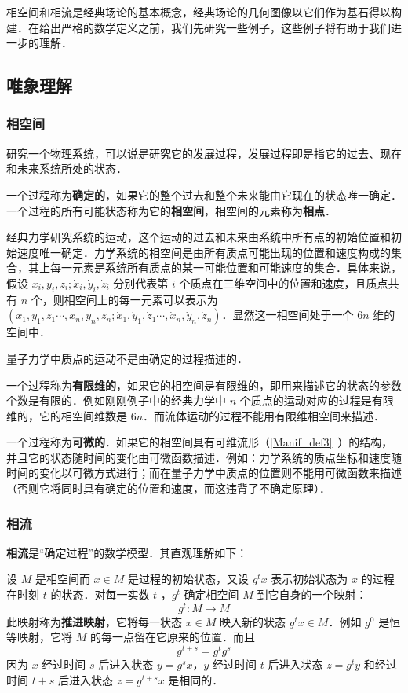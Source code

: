 相空间和相流是经典场论的基本概念，经典场论的几何图像以它们作为基石得以构建．在给出严格的数学定义之前，我们先研究一些例子，这些例子将有助于我们进一步的理解．
\subsection{唯象理解}
\subsubsection{相空间}
研究一个物理系统，可以说是研究它的发展过程，发展过程即是指它的过去、现在和未来系统所处的状态．

一个过程称为\textbf{确定的}，如果它的整个过去和整个未来能由它现在的状态唯一确定．一个过程的所有可能状态称为它的\textbf{相空间}，相空间的元素称为\textbf{相点}．

\begin{example}{}
经典力学研究系统的运动，这个运动的过去和未来由系统中所有点的初始位置和初始速度唯一确定．力学系统的相空间是由所有质点可能出现的位置和速度构成的集合，其上每一元素是系统所有质点的某一可能位置和可能速度的集合．具体来说，假设 $x_{i},y_i,z_i;\dot{x}_i,\dot{y}_i,\dot z_i$ 分别代表第 $i$ 个质点在三维空间中的位置和速度，且质点共有 $n$ 个，则相空间上的每一元素可以表示为 $(x_1,y_1,z_1\cdots,x_n,y_n,z_n;\dot x _1,\dot y_1,\dot z_1\cdots,\dot x_n,\dot y_n,\dot z_n)$．显然这一相空间处于一个 $6n$ 维的空间中．

量子力学中质点的运动不是由确定的过程描述的．
\end{example}

一个过程称为\textbf{有限维的}，如果它的相空间是有限维的，即用来描述它的状态的参数个数是有限的．例如刚刚例子中的经典力学中 $n$ 个质点的运动对应的过程是有限维的，它的相空间维数是 $6n$．而流体运动的过程不能用有限维相空间来描述．

一个过程称为\textbf{可微的}．如果它的相空间具有可维流形（\autoref{Manif_def3}~）的结构，并且它的状态随时间的变化由可微函数描述．例如：力学系统的质点坐标和速度随时间的变化以可微方式进行；而在量子力学中质点的位置则不能用可微函数来描述（否则它将同时具有确定的位置和速度，而这违背了不确定原理）．
\subsubsection{相流}
\textbf{相流}是“确定过程”的数学模型．其直观理解如下：

设 $M$ 是相空间而 $x\in M$ 是过程的初始状态，又设 $g^t x$ 表示初始状态为 $x$ 的过程在时刻 $t$ 的状态．对每一实数 $t$ ，$g^t$ 确定相空间 $M$ 到它自身的一个映射：
\begin{equation}
g^t:M\rightarrow M
\end{equation}
此映射称为\textbf{推进映射}，它将每一状态 $x\in M$ 映入新的状态 $g^t x\in M$．例如 $g^0$ 是恒等映射，它将 $M$ 的每一点留在它原来的位置．而且
\begin{equation}
g^{t+s}=g^tg^s
\end{equation}
因为 $x$ 经过时间 $s$ 后进入状态 $y=g^s x$，$y$ 经过时间 $t$ 后进入状态 $z=g^t y$ 和经过时间 $t+s$ 后进入状态 $z=g^{t+s} x$ 是相同的．

